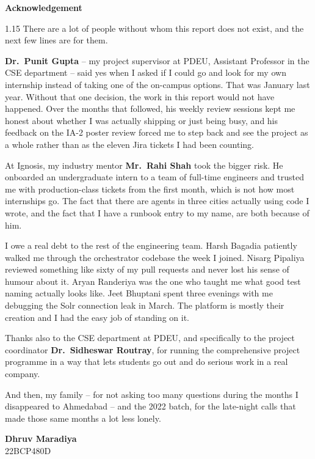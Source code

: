 \thispagestyle{plain}
\begin{center}
{\Large \bf Acknowledgement}
\end{center}
\vspace{0.4cm}

\begin{spacing}{1.15}
There are a lot of people without whom this report does not exist, and the next few lines are for them.

{\bf Dr.~Punit Gupta} -- my project supervisor at PDEU, Assistant Professor in the CSE department -- said yes when I asked if I could go and look for my own internship instead of taking one of the on-campus options. That was January last year. Without that one decision, the work in this report would not have happened. Over the months that followed, his weekly review sessions kept me honest about whether I was actually shipping or just being busy, and his feedback on the IA-2 poster review forced me to step back and see the project as a whole rather than as the eleven Jira tickets I had been counting.

At Ignosis, my industry mentor {\bf Mr.~Rahi Shah} took the bigger risk. He onboarded an undergraduate intern to a team of full-time engineers and trusted me with production-class tickets from the first month, which is not how most internships go. The fact that there are agents in three cities actually using code I wrote, and the fact that I have a runbook entry to my name, are both because of him.

I owe a real debt to the rest of the engineering team. Harsh Bagadia patiently walked me through the orchestrator codebase the week I joined. Nisarg Pipaliya reviewed something like sixty of my pull requests and never lost his sense of humour about it. Aryan Randeriya was the one who taught me what good test naming actually looks like. Jeet Bhuptani spent three evenings with me debugging the Solr connection leak in March. The platform is mostly their creation and I had the easy job of standing on it.

Thanks also to the CSE department at PDEU, and specifically to the project coordinator {\bf Dr.~Sidheswar Routray}, for running the comprehensive project programme in a way that lets students go out and do serious work in a real company.

And then, my family -- for not asking too many questions during the months I disappeared to Ahmedabad -- and the 2022 batch, for the late-night calls that made those same months a lot less lonely.
\end{spacing}

\vspace{0.4cm}

\begin{flushright}
{\bf Dhruv Maradiya}\\
22BCP480D\\
\end{flushright}
\clearpage

